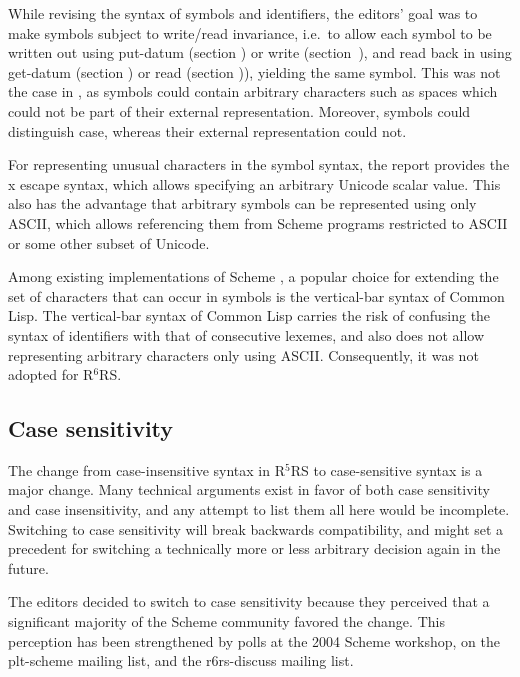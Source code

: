 \documentclass[twoside,twocolumn]{algol60}
\newcommand{\rn}[1]{R$^{#1}$RS}
\begin{document}
While revising the syntax of symbols and identifiers, the editors'
goal was to make symbols subject to write/read invariance, i.e.\ to
allow each symbol to be written out using {\cf put-datum} (section
) or {\cf write}
(section~), and
read back in using {\cf get-datum} (section
) or
{\cf read} (section )), yielding the same symbol.  This
was not the case in , as symbols could contain arbitrary
characters such as spaces which could not be part of their external
representation.  Moreover, symbols could distinguish case, whereas
their external representation could not.

For representing unusual characters in the symbol syntax, the report
provides the {\cf\backwhack{}x} escape syntax, which allows specifying
an arbitrary Unicode scalar value.  This also has the advantage that
arbitrary symbols can be represented using only ASCII, which allows
referencing them from Scheme programs restricted to ASCII or some
other subset of Unicode.

Among existing implementations of Scheme , a popular choice for
extending the set of characters that can occur in symbols is the
vertical-bar syntax of Common Lisp.  The vertical-bar syntax of Common
Lisp carries the risk of confusing the syntax of identifiers with that
of consecutive lexemes, and also does not allow representing arbitrary
characters only using ASCII.  Consequently, it was not adopted for
\rn{6}.

\subsection{Case sensitivity}
\label{casesensitivityrationalesection}

The change from case-insensitive syntax in \rn{5} to case-sensitive
syntax is a major change.  Many technical arguments exist in favor of
both case sensitivity and case insensitivity, and any attempt to list
them all here would be incomplete.  
Switching to case sensitivity will break backwards compatibility, and
might set a precedent for switching a technically more or less
arbitrary decision again in the future.

The editors decided to switch to case sensitivity because they
perceived that a significant majority of the Scheme community favored
the change.  This perception has been strengthened by polls at the
2004 Scheme workshop, on the {\cf plt-scheme} mailing list, and the
{\cf r6rs-discuss} mailing list.
\end{document}
